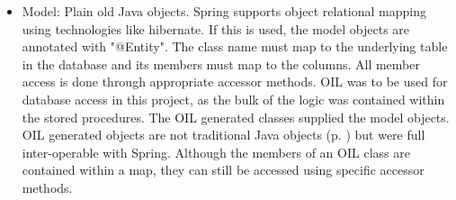 \documentclass[a4paper, 11pt, titlepage]{article}
\begin{document}
\begin{itemize} 
\item Model: Plain old Java objects. Spring supports object relational mapping using technologies like hibernate. If this is used, the model objects are annotated with "@Entity". The class name must map to the underlying table in the database and its members must map to the columns. All member access is done through appropriate accessor methods. 
OIL was to be used for database access in this project, as the bulk of the logic was contained within the stored procedures. The OIL generated classes supplied the model objects. OIL generated objects are not traditional Java objects (p. \pageref{metadata}) but were full inter-operable with Spring. Although the members of an OIL class are contained within a map, they can still be accessed using specific accessor methods. 


\end{itemize}
\end{document}
